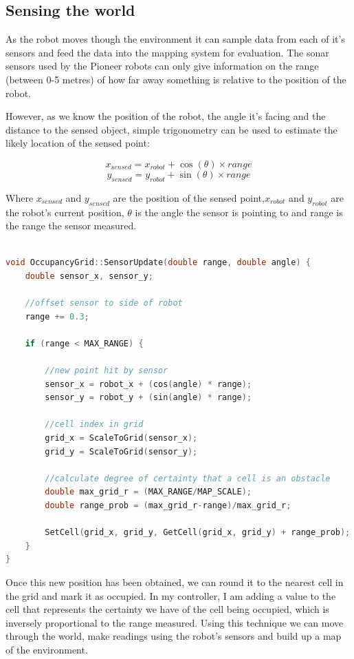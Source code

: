 \documentclass{article}
\begin{document}
\subsection{Sensing the world}
As the robot moves though the environment it can sample data from each of it's sensors and feed the data into the mapping system for evaluation. The sonar sensors used by the Pioneer robots can only give information on the range (between 0-5 metres) of how far away something is relative to the position of the robot.

However, as we know the position of the robot, the angle it's facing and the distance to the sensed object, simple trigonometry can be used to estimate the likely location of the sensed point:

\[ x_{sensed} = x_{robot} + \cos (\theta) \times range \]
\[ y_{sensed} = y_{robot} + \sin (\theta) \times range \]

Where $x_{sensed}$ and $y_{sensed}$ are the position of the sensed point,$x_{robot}$ and $y_{robot}$ are the robot's current position, $\theta$ is the angle the sensor is pointing to and range is the range the sensor measured.

\begin{center}
	\begin{lstlisting}[language=c++, showstringspaces=false, caption={C++ code used for calculating the new point given the current position, angle and range}]

void OccupancyGrid::SensorUpdate(double range, double angle) {
	double sensor_x, sensor_y;

	//offset sensor to side of robot
	range += 0.3;
	
	if (range < MAX_RANGE) {

		//new point hit by sensor
		sensor_x = robot_x + (cos(angle) * range);
		sensor_y = robot_y + (sin(angle) * range);

		//cell index in grid
		grid_x = ScaleToGrid(sensor_x);
		grid_y = ScaleToGrid(sensor_y);

		//calculate degree of certainty that a cell is an obstacle
		double max_grid_r = (MAX_RANGE/MAP_SCALE);
		double range_prob = (max_grid_r-range)/max_grid_r;

		SetCell(grid_x, grid_y, GetCell(grid_x, grid_y) + range_prob);
	}
}

	\end{lstlisting}
\end{center}

Once this new position has been obtained, we can round it to the nearest cell in the grid and mark it as occupied. In my controller, I am adding a value to the cell that represents the certainty we have of the cell being occupied, which is inversely proportional to the range measured. Using this technique we can move through the world, make readings using the robot's sensors and build up a map of the environment.
\end{document}
